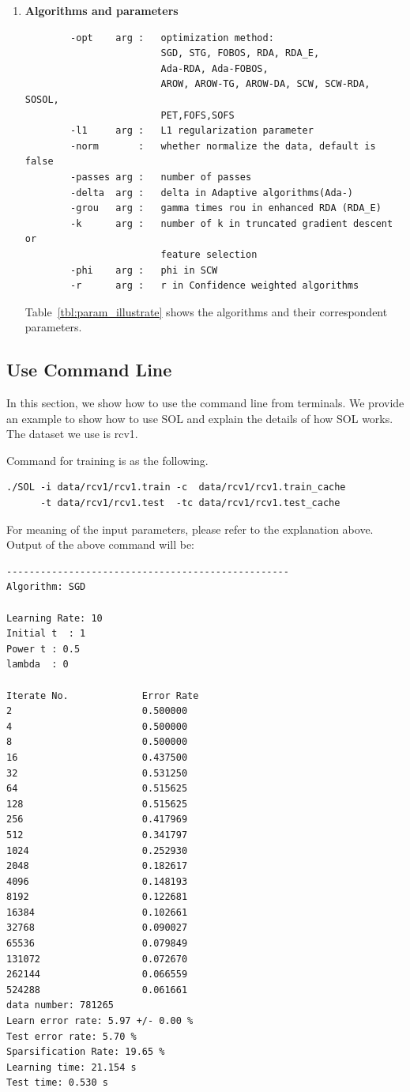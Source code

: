 \documentclass[11pt,a4paper]{article}
\newlength{\wideitemsep}
\let\olditem\item
\renewcommand{\item}{\setlength{\itemsep}{\wideitemsep}\olditem}
\begin{document}
\begin{enumerate}
    \item \textbf{Algorithms and parameters}
        \begin{lstlisting}
        -opt    arg :   optimization method: 
                        SGD, STG, FOBOS, RDA, RDA_E, 
                        Ada-RDA, Ada-FOBOS, 
                        AROW, AROW-TG, AROW-DA, SCW, SCW-RDA, SOSOL,
                        PET,FOFS,SOFS 
        -l1     arg :   L1 regularization parameter
        -norm       :   whether normalize the data, default is false
        -passes arg :   number of passes 
        -delta  arg :   delta in Adaptive algorithms(Ada-)
        -grou   arg :   gamma times rou in enhanced RDA (RDA_E)
        -k      arg :   number of k in truncated gradient descent or 
                        feature selection
        -phi    arg :   phi in SCW
        -r      arg :   r in Confidence weighted algorithms
        \end{lstlisting}

        Table~\ref{tbl:param_illustrate} shows the algorithms and their
        correspondent parameters.  
        \end{enumerate}

\subsection{Use Command Line}
In this section, we show how to use the command line from terminals. We provide
an example to show how to use SOL and explain the details of how SOL works. The
dataset we use is rcv1.

Command for training is as the following.
\lstset{language=bash,
framexleftmargin=0.5cm,
xleftmargin=0.5cm,
}
\begin{lstlisting}
./SOL -i data/rcv1/rcv1.train -c  data/rcv1/rcv1.train_cache 
      -t data/rcv1/rcv1.test  -tc data/rcv1/rcv1.test_cache
\end{lstlisting}

For meaning of the input parameters, please refer to the explanation above.
Output of the above command will be:
\lstset{language=bash}
\begin{lstlisting}
--------------------------------------------------
Algorithm: SGD

Learning Rate: 10
Initial t  : 1
Power t : 0.5
lambda  : 0

Iterate No.             Error Rate
2                       0.500000
4                       0.500000
8                       0.500000
16                      0.437500
32                      0.531250
64                      0.515625
128                     0.515625
256                     0.417969
512                     0.341797
1024                    0.252930
2048                    0.182617
4096                    0.148193
8192                    0.122681
16384                   0.102661
32768                   0.090027
65536                   0.079849
131072                  0.072670
262144                  0.066559
524288                  0.061661
data number: 781265
Learn error rate: 5.97 +/- 0.00 %
Test error rate: 5.70 %
Sparsification Rate: 19.65 %
Learning time: 21.154 s
Test time: 0.530 s
\end{lstlisting}
\end{document}
